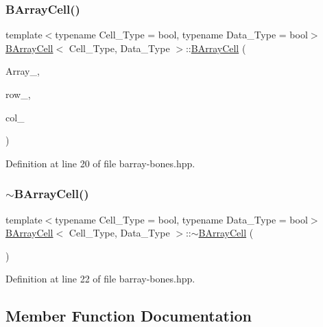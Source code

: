 \subsubsection{\texorpdfstring{B\+Array\+Cell()}{BArrayCell()}}
{\footnotesize\ttfamily template$<$typename Cell\+\_\+\+Type = bool, typename Data\+\_\+\+Type = bool$>$ \\
\hyperlink{class_b_array_cell}{B\+Array\+Cell}$<$ Cell\+\_\+\+Type, Data\+\_\+\+Type $>$\+::\hyperlink{class_b_array_cell}{B\+Array\+Cell} (\begin{DoxyParamCaption}\item[{\hyperlink{class_b_array}{B\+Array}$<$ Cell\+\_\+\+Type, Data\+\_\+\+Type $>$ $\ast$}]{Array\+\_\+,  }\item[{\hyperlink{typedefs_8hpp_a91ad9478d81a7aaf2593e8d9c3d06a14}{uint}}]{row\+\_\+,  }\item[{\hyperlink{typedefs_8hpp_a91ad9478d81a7aaf2593e8d9c3d06a14}{uint}}]{col\+\_\+ }\end{DoxyParamCaption})\hspace{0.3cm}{\ttfamily [inline]}}



Definition at line 20 of file barray-\/bones.\+hpp.

\mbox{\label{class_b_array_cell_a6fbc56424caade490a72685cc35ad0e9}} 
\subsubsection{\texorpdfstring{$\sim$\+B\+Array\+Cell()}{~BArrayCell()}}
{\footnotesize\ttfamily template$<$typename Cell\+\_\+\+Type = bool, typename Data\+\_\+\+Type = bool$>$ \\
\hyperlink{class_b_array_cell}{B\+Array\+Cell}$<$ Cell\+\_\+\+Type, Data\+\_\+\+Type $>$\+::$\sim$\hyperlink{class_b_array_cell}{B\+Array\+Cell} (\begin{DoxyParamCaption}{ }\end{DoxyParamCaption})\hspace{0.3cm}{\ttfamily [inline]}}



Definition at line 22 of file barray-\/bones.\+hpp.



\subsection{Member Function Documentation}
\mbox{\label{class_b_array_cell_a726de4e638ec37b1147d737809765953}} 
